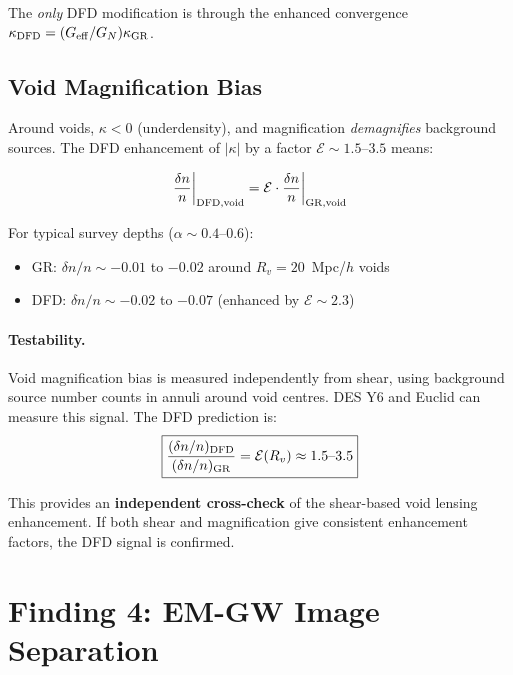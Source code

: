 \documentclass[11pt,a4paper]{article}
\newcommand{\Geff}{G_{\rm eff}}
\begin{document}
The \emph{only} DFD modification is through the enhanced convergence
$\kappa_{\rm DFD} = (\Geff/G_N)\kappa_{\rm GR}$.

\subsection{Void Magnification Bias}

Around voids, $\kappa < 0$ (underdensity), and magnification
\emph{demagnifies} background sources.  The DFD enhancement of $|\kappa|$
by a factor $\mathcal{E} \sim 1.5$--$3.5$ means:

\begin{equation}
\frac{\delta n}{n}\bigg|_{\rm DFD,void}
= \mathcal{E} \cdot \frac{\delta n}{n}\bigg|_{\rm GR,void}
\end{equation}

For typical survey depths ($\alpha \sim 0.4$--$0.6$):
\begin{itemize}
\item GR: $\delta n/n \sim -0.01$ to $-0.02$ around $R_v = 20$~Mpc/$h$ voids
\item DFD: $\delta n/n \sim -0.02$ to $-0.07$ (enhanced by $\mathcal{E} \sim 2.3$)
\end{itemize}

\paragraph{Testability.}
Void magnification bias is measured independently from shear, using
background source number counts in annuli around void centres.
DES Y6 and Euclid can measure this signal.  The DFD prediction is:
\begin{equation}
\boxed{
\frac{(\delta n/n)_{\rm DFD}}{(\delta n/n)_{\rm GR}} = \mathcal{E}(R_v)
\approx 1.5\text{--}3.5
}
\end{equation}

This provides an \textbf{independent cross-check} of the shear-based
void lensing enhancement.  If both shear and magnification give
consistent enhancement factors, the DFD signal is confirmed.


\section{Finding 4: EM-GW Image Separation}
\label{sec:em-gw}
\end{document}
